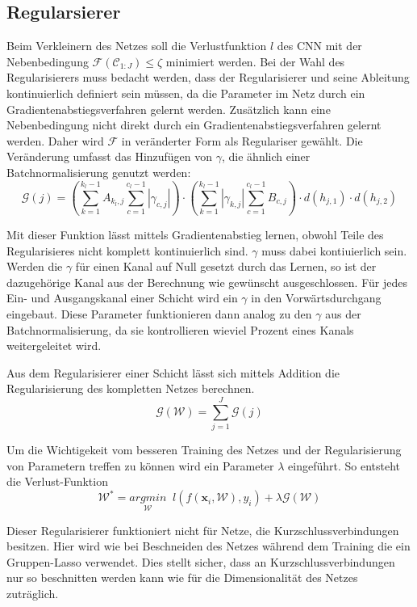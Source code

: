 \subsection{Regularsierer}
Beim Verkleinern des Netzes soll die Verlustfunktion $l$ des CNN mit der Nebenbedingung $\mathcal{F}(\mathcal{C}_{1:J})\leq \zeta$ minimiert werden. Bei der Wahl des Regularisierers muss bedacht werden, dass der Regularisierer und seine Ableitung kontinuierlich definiert sein müssen, da die Parameter im Netz durch ein Gradientenabstiegsverfahren gelernt werden. Zusätzlich kann eine Nebenbedingung nicht direkt durch ein Gradientenabstiegsverfahren gelernt werden. Daher wird $\mathcal{F}$ in veränderter Form als Regulariser gewählt. Die Veränderung umfasst das Hinzufügen von $\gamma$, die ähnlich einer Batchnormalisierung genutzt werden:
\begin{equation}
\mathcal{G}(j)=\left(\sum_{k=1}^{k_l-1} A_{k_l,j} \sum_{c=1}^{c_l-1} |\gamma_{c, j} | \right) \cdot \left(\sum_{k=1}^{k_l-1} |\gamma_{k,j} |   \sum_{c=1}^{c_l-1} B_{c,j}\right) \cdot d(h_{j,1}) \cdot d(h_{j,2})  
\end{equation}

Mit dieser Funktion lässt mittels Gradientenabstieg lernen, obwohl Teile des Regularisieres nicht komplett kontinuierlich sind. $\gamma$ muss dabei kontiuierlich sein. Werden die $\gamma$ für einen Kanal auf Null gesetzt durch das Lernen, so ist der dazugehörige Kanal aus der Berechnung wie gewünscht ausgeschlossen. Für jedes Ein- und Ausgangskanal einer Schicht wird ein $\gamma$ in den Vorwärtsdurchgang eingebaut. Diese Parameter funktionieren dann analog zu den $\gamma$ aus der Batchnormalisierung, da sie kontrollieren wieviel Prozent eines Kanals weitergeleitet wird.


Aus dem Regularisierer einer Schicht lässt sich mittels Addition die Regularisierung des kompletten Netzes berechnen.
\begin{equation}
 \mathcal{G}(\mathcal{W})=\sum_{j=1}^{J} \mathcal{G}(j)
\end{equation}


Um die Wichtigekeit vom besseren Training des Netzes und der Regularisierung von Parametern treffen zu können wird ein Parameter $\lambda$ eingeführt. So entsteht die Verlust-Funktion
\begin{equation}
 \mathcal{W}^{\ast}=\underset{\mathcal{W}}{arg min}\; \; l(f(\mathbf{x}_i, \mathcal{W}),y_i) + \lambda \mathcal{G}(\mathcal{W})
\end{equation}



Dieser Regularisierer funktioniert nicht für Netze, die Kurzschlussverbindungen besitzen. Hier wird wie bei Beschneiden des Netzes während dem Training die ein Gruppen-Lasso verwendet. Dies stellt sicher, dass an Kurzschlussverbindungen nur so beschnitten werden kann wie für die Dimensionalität des Netzes zuträglich.







